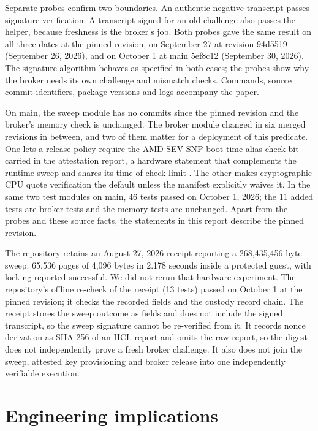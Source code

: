 \documentclass[10pt,letterpaper]{article}
\let\plainsection\section
\renewcommand{\section}{\Needspace{6\baselineskip}\plainsection}
\begin{document}
Separate probes confirm two boundaries. An authentic negative transcript passes signature verification. A transcript signed for an old challenge also passes the helper, because freshness is the broker's job. Both probes gave the same result on all three dates at the pinned revision, on September 27 at revision 94d5519 (September 26, 2026), and on October 1 at main 5ef8c12 (September 30, 2026). The signature algorithm behaves as specified in both cases; the probes show why the broker needs its own challenge and mismatch checks. Commands, source commit identifiers, package versions and logs accompany the paper.


On main, the sweep module has no commits since the pinned revision and the broker's memory check is unchanged. The broker module changed in six merged revisions in between, and two of them matter for a deployment of this predicate. One lets a release policy require the AMD SEV-SNP boot-time alias-check bit carried in the attestation report, a hardware statement that complements the runtime sweep and shares its time-of-check limit \cite{ref8}. The other makes cryptographic CPU quote verification the default unless the manifest explicitly waives it. In the same two test modules on main, 46 tests passed on October 1, 2026; the 11 added tests are broker tests and the memory tests are unchanged. Apart from the probes and these source facts, the statements in this report describe the pinned revision.


The repository retains an August 27, 2026 receipt reporting a 268,435,456-byte sweep: 65,536 pages of 4,096 bytes in 2.178 seconds inside a protected guest, with locking reported successful. We did not rerun that hardware experiment. The repository's offline re-check of the receipt (13 tests) passed on October 1 at the pinned revision; it checks the recorded fields and the custody record chain. The receipt stores the sweep outcome as fields and does not include the signed transcript, so the sweep signature cannot be re-verified from it. It records nonce derivation as SHA-256 of an HCL report and omits the raw report, so the digest does not independently prove a fresh broker challenge. It also does not join the sweep, attested key provisioning and broker release into one independently verifiable execution.


\section{Engineering implications}
\end{document}
